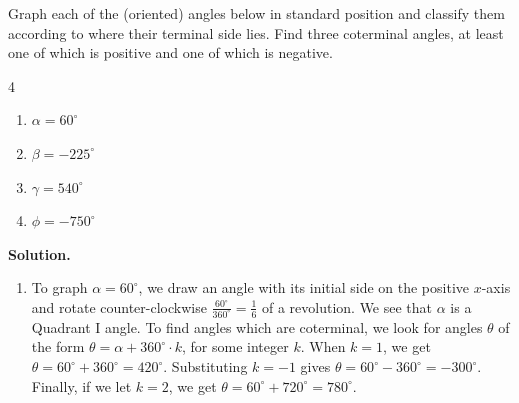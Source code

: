 \documentclass{ximera}
\begin{document}
\begin{example}  \label{orientedcoterminaldegree} Graph each of the (oriented) angles below in standard position and classify them according to where their terminal side lies. Find three coterminal angles, at least one of which is positive and one of which is negative.

\begin{multicols}{4}

\begin{enumerate}

\item  $\alpha = 60^{\circ}$

\item  $\beta = -225^{\circ}$

\item  $\gamma = 540^{\circ}$

\item  $\phi = -750^{\circ}$

\end{enumerate}

\end{multicols}

{\bf Solution.}  

\begin{enumerate}

\item  To graph $\alpha = 60^{\circ}$, we draw an angle with its initial side on the positive $x$-axis and rotate counter-clockwise $\frac{60^{\circ}}{360^{\circ}} = \frac{1}{6}$ of a revolution.  We see that $\alpha$ is a Quadrant I angle.  To find angles which are coterminal, we look for angles $\theta$ of the form $\theta = \alpha + 360^{\circ} \cdot k$, for some integer $k$.  When $k = 1$, we get $\theta =  60^{\circ} + 360^{\circ} = 420^{\circ}$.   Substituting $k = -1$ gives $\theta = 60^{\circ} - 360^{\circ} = -300^{\circ}$.  Finally, if we let $k = 2$, we get $\theta =  60^{\circ} + 720^{\circ} = 780^{\circ}$.  

\begin{image}
\end{image}
\end{enumerate}
\end{example}
\end{document}
